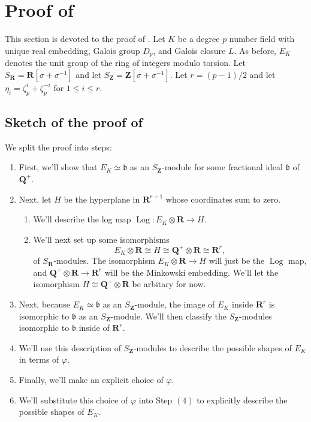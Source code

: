 \documentclass{amsart}
\newcommand{\QQ}{\mathbf{Q}}
\newcommand{\ZZ}{\mathbf{Z}}
\newcommand{\RR}{\mathbf{R}}
\DeclareMathOperator{\Log}{Log}
\numberwithin{equation}{section}
\begin{document}
 
 
 
 
 
 
 
 
 
 
 
 
 
\section{Proof of } 
This section is devoted to the proof of . Let $K$ be a degree $p$ number field with unique real embedding, Galois group $D_p$, and Galois closure $L$. As before, $E_K$ denotes the unit group of the ring of integers modulo torsion. Let $S_\RR = \RR[\sigma + \sigma^{-1}]$ and let $S_{\ZZ} = \ZZ[\sigma + \sigma^{-1}]$. Let $r = (p-1)/2$ and let $\eta_i = \zeta_p^i + \zeta_p^{-i}$ for $1 \leq i \leq r$. 

\subsection{Sketch of the proof of }
We split the proof into steps:
\begin{enumerate}
    \item First, we'll show that $E_K \simeq \mathfrak{b}$ as an $S_{\ZZ}$-module for some fractional ideal $\mathfrak{b}$ of $\QQ^+$. 
    \item Next, let $H$ be the hyperplane in $\RR^{r+1}$ whose coordinates sum to zero. \begin{enumerate}
        \item We'll describe the log map $\Log \colon E_K \otimes \RR \rightarrow H$.
        \item We'll next set up some isomorphisms 
\[
    E_K \otimes \RR \cong H \cong \QQ^+ \otimes \RR \cong \RR^r,
\]
of $S_{\RR}$-modules. The isomorphism $E_K \otimes \RR \rightarrow H$ will just be the $\Log$ map, and $\QQ^+ \otimes \RR \rightarrow \RR^r$ will be the Minkowski embedding. We'll let the isomorphism $H \cong \QQ^+ \otimes \RR$ be arbitary for now.
    \end{enumerate}

    \item Next, because $E_K \simeq \mathfrak{b}$ as an $S_{\ZZ}$-module, the image of $E_K$ inside $\RR^r$ is isomorphic to $\mathfrak{b}$ as an $S_{\ZZ}$-module. We'll then classify the $S_{\ZZ}$-modules isomorphic to $\mathfrak{b}$ inside of $\RR^r$.
    \item We'll use this description of $S_{\ZZ}$-modules to describe the possible shapes of $E_K$ in terms of $\varphi$.
    \item Finally, we'll make an explicit choice of $\varphi$.
    \item We'll substitute this choice of $\varphi$ into Step $(4)$ to explicitly describe the possible shapes of $E_K$.
\end{enumerate}
\end{document}
